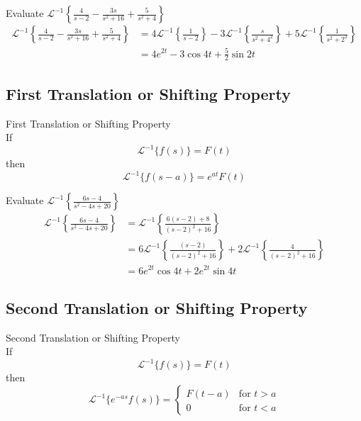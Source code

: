 \documentclass[12pt]{article}
\newcommand{\Lapinv}{\mathscr{L}^{-1}}
\begin{document}
\begin{example}{Evaluate $\Lapinv \left\{ \frac{4}{s-2} - \frac{3s}{s^2+16} + \frac{5}{s^2+4} \right\}$}{}
    \begin{align*}
        \Lapinv \left\{ \frac{4}{s-2} - \frac{3s}{s^2+16} + \frac{5}{s^2+4} \right\} &= 4\Lapinv \left\{ \frac{1}{s-2} \right\} - 3\Lapinv \left\{ \frac{s}{s^2+4^2} \right\} + 5\Lapinv \left\{ \frac{1}{s^2+2^2} \right\} \\
        &= 4e^{2t} - 3\cos{4t} + \frac{5}{2}\sin{2t}
    \end{align*}
\end{example}


\subsection{First Translation or Shifting Property}

\begin{theorem}{First Translation or Shifting Property}{}
    \\If \[
        \Lapinv \{ f(s) \} = F(t)
    \] then \[
        \Lapinv \{ f(s-a) \} = e^{at}F(t)
    \]
\end{theorem}

\begin{example}{Evaluate $\displaystyle \Lapinv \left\{ \frac{6s-4}{s^2-4s+20} \right\}$}{}
    \begin{align*}
        \Lapinv \left\{ \frac{6s-4}{s^2-4s+20} \right\} &= \Lapinv \left\{ \frac{6(s-2)+8}{(s-2)^2+16} \right\} \\
        &= 6\Lapinv \left\{ \frac{(s-2)}{(s-2)^2+16} \right\} + 2\Lapinv \left\{ \frac{4}{(s-2)^2+16} \right\} \\
        &= 6e^{2t}\cos{4t} + 2e^{2t}\sin{4t}
    \end{align*}
\end{example}


\subsection{Second Translation or Shifting Property}

\begin{theorem}{Second Translation or Shifting Property}{}
    \\If \[
        \Lapinv \{ f(s) \} = F(t)
    \] then \[
        \Lapinv \{ e^{-as}f(s) \} = 
        \begin{cases}
            F(t-a) & \text{for } t > a \\
            0 & \text{for } t < a
        \end{cases}
    \]
\end{theorem}
\end{document}
